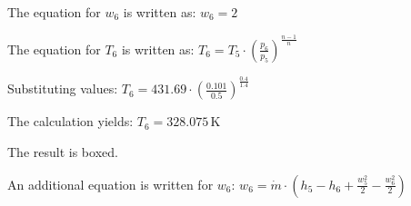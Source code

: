 The equation for \( w_6 \) is written as:  
\( w_6 = 2 \)  

The equation for \( T_6 \) is written as:  
\( T_6 = T_5 \cdot \left( \frac{p_6}{p_5} \right)^{\frac{n-1}{n}} \)  

Substituting values:  
\( T_6 = 431.69 \cdot \left( \frac{0.101}{0.5} \right)^{\frac{0.4}{1.4}} \)  

The calculation yields:  
\( T_6 = 328.075 \, \text{K} \)  

The result is boxed.  

An additional equation is written for \( w_6 \):  
\( w_6 = \dot{m} \cdot \left( h_5 - h_6 + \frac{w_5^2}{2} - \frac{w_6^2}{2} \right) \)